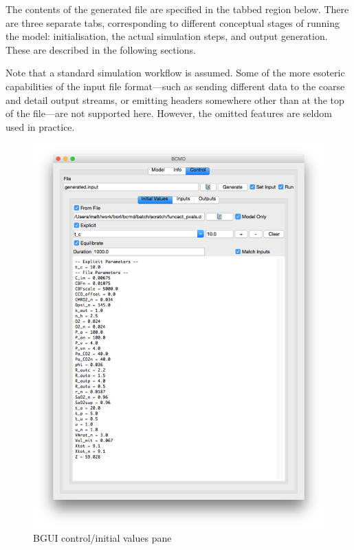 \documentclass[a4paper,11pt]{article}
\begin{document}
The contents of the generated file are specified in the tabbed region below. There are three separate tabs, corresponding to different conceptual stages of running the model: initialisation, the actual simulation steps, and output generation. These are described in the following sections.

Note that a standard simulation workflow is assumed. Some of the more esoteric capabilities of the input file format---such as sending different data to the coarse and detail output streams, or emitting headers somewhere other than at the top of the file---are not supported here. However, the omitted features are seldom used in practice. 

\begin{figure}[tbph]
\begin{center}
\includegraphics[scale=0.5]{figures/init.png}
\caption{BGUI control/initial values pane}
\label{fig:bgui:init}
\end{center}
\end{figure}
\end{document}
